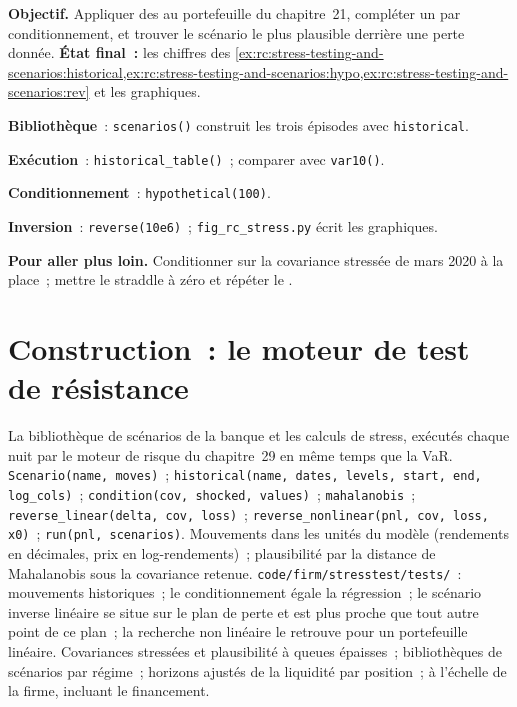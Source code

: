 \begin{tutorial}
\textbf{Objectif.} Appliquer des  au portefeuille du chapitre~21, compléter un  par
conditionnement, et trouver le scénario le plus plausible derrière une perte donnée. \textbf{État final~:} les
chiffres des
\cref{ex:rc:stress-testing-and-scenarios:historical,ex:rc:stress-testing-and-scenarios:hypo,ex:rc:stress-testing-and-scenarios:rev}
et les graphiques.
\begin{tutsteps}
\item \textbf{Bibliothèque}~: \texttt{scenarios()} construit les trois épisodes avec \texttt{historical}.
\item \textbf{Exécution}~: \texttt{historical\_table()}~; comparer avec \texttt{var10()}.
\item \textbf{Conditionnement}~: \texttt{hypothetical(100)}.
\item \textbf{Inversion}~: \texttt{reverse(10e6)}~; \texttt{fig\_rc\_stress.py} écrit les graphiques.
\end{tutsteps}
\textbf{Pour aller plus loin.} Conditionner sur la covariance stressée de mars 2020 à la place~; mettre le
straddle à zéro et répéter le .
\end{tutorial}

\section{Construction~: le moteur de test de résistance}\label{bld:rc:stress-testing-and-scenarios:stresstest}

\begin{build}
 La bibliothèque de scénarios de la banque et les calculs de stress, exécutés chaque nuit par le moteur
de risque du chapitre~29 en même temps que la VaR.
 \texttt{Scenario(name, moves)}~; \texttt{historical(name, dates, levels,
start, end, log\_cols)}~; \texttt{condition(cov, shocked, values)}~; \texttt{mahalanobis}~;
\texttt{reverse\_linear(delta, cov, loss)}~; \texttt{reverse\_nonlinear(pnl, cov, loss, x0)}~;
\texttt{run(pnl, scenarios)}.
 Mouvements dans les unités du modèle (rendements en décimales, prix en log-rendements)~;
plausibilité par la distance de Mahalanobis sous la covariance retenue.
 \texttt{code/firm/stresstest/tests/}~: mouvements historiques~; le conditionnement
égale la régression~; le scénario inverse linéaire se situe sur le plan de perte et est plus proche que tout autre
point de ce plan~; la recherche non linéaire le retrouve pour un portefeuille linéaire.
 Covariances stressées et plausibilité à queues épaisses~; bibliothèques de scénarios par
régime~; horizons ajustés de la liquidité par position~;  à l'échelle de la firme, incluant le financement.
\end{build}

